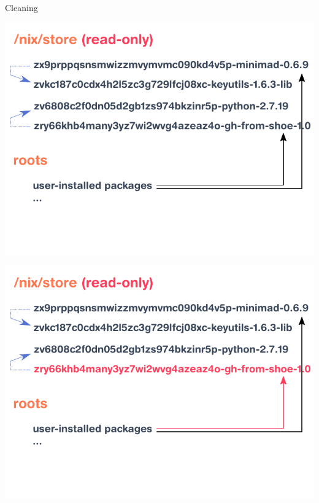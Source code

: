 \documentclass[aspectratio=169]{beamer}
\begin{document}
\begin{frame}{Cleaning}
     {
        \begin{center}
            \includegraphics[height=0.98\textheight]{img/schema-nix-store-gc-v2-1.pdf}
        \end{center}
    }
     {
        \begin{center}
            \includegraphics[height=0.98\textheight]{img/schema-nix-store-gc-v2-2.pdf}
        \end{center}
    }
     {
        \begin{center}

\end{center}}
\end{frame}
\end{document}
